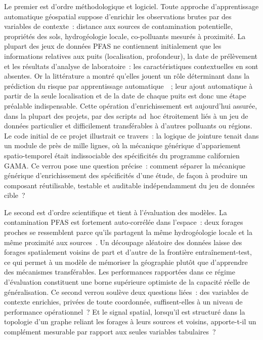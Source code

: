 Le premier est d'ordre m\'ethodologique et logiciel. Toute approche d'apprentissage automatique g\'eospatial suppose d'enrichir les observations brutes par des variables de contexte~: distance aux sources de contamination potentielle, propri\'et\'es des sols, hydrog\'eologie locale, co-polluants mesur\'es \`a proximit\'e. La plupart des jeux de donn\'ees PFAS ne contiennent initialement que les informations relatives aux puits (localisation, profondeur), la date de pr\'el\`evement et les r\'esultats d'analyse de laboratoire~: les caract\'eristiques contextuelles en sont absentes. Or la litt\'erature a montr\'e qu'elles jouent un r\^ole d\'eterminant dans la pr\'ediction du risque par apprentissage automatique~\cite{dong2024pfas,george2021pfas}~; leur ajout automatique \`a partir de la seule localisation et de la date de chaque puits est donc une \'etape pr\'ealable indispensable. Cette op\'eration d'enrichissement est aujourd'hui assur\'ee, dans la plupart des projets, par des scripts ad~hoc \'etroitement li\'es \`a un jeu de donn\'ees particulier et difficilement transf\'erables \`a d'autres polluants ou r\'egions. Le code initial de ce projet illustrait ce travers~: la logique de jointure tenait dans un module de pr\`es de mille lignes, o\`u la m\'ecanique g\'en\'erique d'appariement spatio-temporel \'etait indissociable des sp\'ecificit\'es du programme californien GAMA. Ce verrou pose une question pr\'ecise~: comment s\'eparer la m\'ecanique g\'en\'erique d'enrichissement des sp\'ecificit\'es d'une \'etude, de fa\c{c}on \`a produire un composant r\'eutilisable, testable et auditable ind\'ependamment du jeu de donn\'ees cible~?

Le second est d'ordre scientifique et tient \`a l'\'evaluation des mod\`eles. La contamination PFAS est fortement auto-corr\'el\'ee dans l'espace~: deux forages proches se ressemblent parce qu'ils partagent la m\^eme hydrog\'eologie locale et la m\^eme proximit\'e aux sources~\cite{guelfo2021pfas}. Un d\'ecoupage al\'eatoire des donn\'ees laisse des forages spatialement voisins de part et d'autre de la fronti\`ere entra\^inement-test, ce qui permet \`a un mod\`ele de m\'emoriser la g\'eographie plut\^ot que d'apprendre des m\'ecanismes transf\'erables. Les performances rapport\'ees dans ce r\'egime d'\'evaluation constituent une borne sup\'erieure optimiste de la capacit\'e r\'eelle de g\'en\'eralisation. Ce second verrou soul\`eve deux questions li\'ees~: des variables de contexte enrichies, priv\'ees de toute coordonn\'ee, suffisent-elles \`a un niveau de performance op\'erationnel~? Et le signal spatial, lorsqu'il est structur\'e dans la topologie d'un graphe reliant les forages \`a leurs sources et voisins, apporte-t-il un compl\'ement mesurable par rapport aux seules variables tabulaires~?


